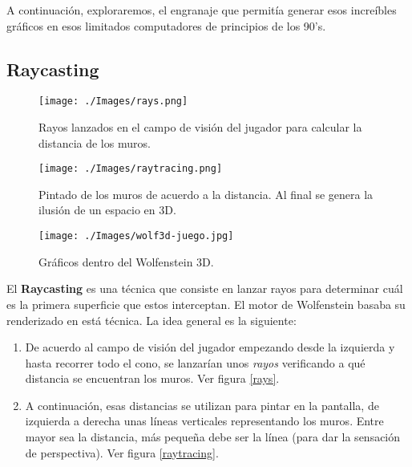 A continuación, exploraremos, el engranaje que permitía generar esos increíbles gráficos en esos limitados computadores de principios de los 90's.

\newpage
\subsection{Raycasting}

\begin{wrapfigure}{r}{0.4\textwidth}
	\begin{center}
		\texttt{[image: ./Images/rays.png]}
	\end{center}	
	\caption{Rayos lanzados en el campo de visión del jugador para calcular la distancia de los muros. \newline}
	\label{rays}
	
	\begin{center}
		\texttt{[image: ./Images/raytracing.png]}
	\end{center}	
	\caption{Pintado de los muros de acuerdo a la distancia. Al final se genera la ilusión de un espacio en 3D. \newline}
	\label{raytracing}
	
	\begin{center}
		\texttt{[image: ./Images/wolf3d-juego.jpg]}
	\end{center}
	\caption{Gráficos dentro del Wolfenstein 3D.}
	\label{wolf3d-inside}

\end{wrapfigure}

El \textbf{Raycasting} es una técnica que consiste en lanzar rayos para determinar cuál es la primera superficie que estos interceptan. El motor de Wolfenstein basaba su renderizado en está técnica. La idea general es la siguiente:

\begin{enumerate}
	\item De acuerdo al campo de visión del jugador empezando desde la izquierda y hasta recorrer todo el cono, se lanzarían unos \emph{rayos} verificando a qué distancia se encuentran los muros. Ver figura \ref{rays}.
	
	\item A continuación, esas distancias se utilizan para pintar en la pantalla, de izquierda a derecha unas líneas verticales representando los muros. Entre mayor sea la distancia, más pequeña debe ser la línea (para dar la sensación de perspectiva). Ver figura \ref{raytracing}.
\end{enumerate}

